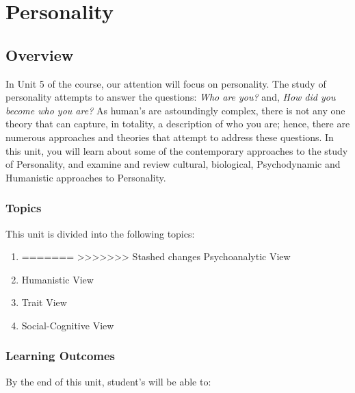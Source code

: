 \documentclass[
]{book}
\providecommand{\tightlist}{%
  \setlength{\itemsep}{0pt}\setlength{\parskip}{0pt}}
\begin{document}
\hypertarget{personality}{%
\chapter{Personality}\label{personality}}

\hypertarget{overview-4}{%
\section*{Overview}\label{overview-4}}

In Unit 5 of the course, our attention will focus on personality. The study of personality attempts to answer the questions: \emph{Who are you?} and, \emph{How did you become who you are?} As human's are astoundingly complex, there is not any one theory that can capture, in totality, a description of who you are; hence, there are numerous approaches and theories that attempt to address these questions. In this unit, you will learn about some of the contemporary approaches to the study of Personality, and examine and review cultural, biological, Psychodynamic and Humanistic approaches to Personality.

\hypertarget{topics-4}{%
\subsection*{Topics}\label{topics-4}}

This unit is divided into the following topics:

\begin{enumerate}
\def\labelenumi{\arabic{enumi}.}
\tightlist
\item
=======
>>>>>>> Stashed changes
  Psychoanalytic View\\
\item
  Humanistic View\\
\item
  Trait View\\
\item
  Social-Cognitive View
\end{enumerate}

\hypertarget{learning-outcomes-3}{%
\subsection*{Learning Outcomes}\label{learning-outcomes-3}}

By the end of this unit, student's will be able to:
\end{document}
